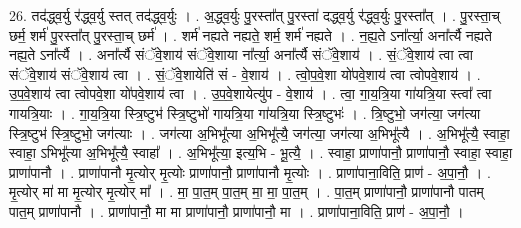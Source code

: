 \documentclass[17pt]{extarticle}
\begin{document}
26. तद॑द्ध्व॒र्यु र॑द्ध्व॒र्यु स्तत् तद॑द्ध्व॒र्युः । . अ॒द्ध्व॒र्युः पु॒रस्ता᳚त् पु॒रस्ता॑ दद्ध्व॒र्यु र॑द्ध्व॒र्युः पु॒रस्ता᳚त् । . पु॒रस्ता॒च् छर्म॒ शर्म॑ पु॒रस्ता᳚त् पु॒रस्ता॒च् छर्म॑ । . शर्म॑ नह्यते नह्यते॒ शर्म॒ शर्म॑ नह्यते । . न॒ह्य॒ते ऽना᳚र्त्या॒ अना᳚र्त्यै नह्यते नह्य॒ते ऽना᳚र्त्यै । . अना᳚र्त्यै संॅवे॒शाय॑ संॅवे॒शाया ना᳚र्त्या॒ अना᳚र्त्यै संॅवे॒शाय॑ । . सं॒ॅवे॒शाय॑ त्वा त्वा संॅवे॒शाय॑ संॅवे॒शाय॑ त्वा । . सं॒ॅवे॒शायेति॑ सं - वे॒शाय॑ । . त्वो॒प॒वे॒शा यो॑पवे॒शाय॑ त्वा त्वोपवे॒शाय॑ । . उ॒प॒वे॒शाय॑ त्वा त्वोपवे॒शा यो॑पवे॒शाय॑ त्वा । . उ॒प॒वे॒शायेत्यु॑प - वे॒शाय॑ । . त्वा॒ गा॒य॒त्रि॒या गा॑यत्रि॒या स्त्वा᳚ त्वा गायत्रि॒याः । . गा॒य॒त्रि॒या स्त्रि॒ष्टुभ॑ स्त्रि॒ष्टुभो॑ गायत्रि॒या गा॑यत्रि॒या स्त्रि॒ष्टुभः॑ । . त्रि॒ष्टुभो॒ जग॑त्या॒ जग॑त्या स्त्रि॒ष्टुभ॑ स्त्रि॒ष्टुभो॒ जग॑त्याः । . जग॑त्या अ॒भिभू᳚त्या अ॒भिभू᳚त्यै॒ जग॑त्या॒ जग॑त्या अ॒भिभू᳚त्यै । . अ॒भिभू᳚त्यै॒ स्वाहा॒ स्वाहा॒ ऽभिभू᳚त्या अ॒भिभू᳚त्यै॒ स्वाहा᳚ । . अ॒भिभू᳚त्या॒ इत्य॒भि - भू॒त्यै॒ । . स्वाहा॒ प्राणा॑पानौ॒ प्राणा॑पानौ॒ स्वाहा॒ स्वाहा॒ प्राणा॑पानौ । . प्राणा॑पानौ मृ॒त्योर् मृ॒त्योः प्राणा॑पानौ॒ प्राणा॑पानौ मृ॒त्योः । . प्राणा॑पाना॒विति॒ प्राण॑ - अ॒पा॒नौ॒ । . मृ॒त्योर् मा॑ मा मृ॒त्योर् मृ॒त्योर् मा᳚ । . मा॒ पा॒त॒म् पा॒त॒म् मा॒ मा॒ पा॒त॒म् । . पा॒त॒म् प्राणा॑पानौ॒ प्राणा॑पानौ पातम् पात॒म् प्राणा॑पानौ । . प्राणा॑पानौ॒ मा मा प्राणा॑पानौ॒ प्राणा॑पानौ॒ मा । . प्राणा॑पाना॒विति॒ प्राण॑ - अ॒पा॒नौ॒ । \newline
\end{document}
